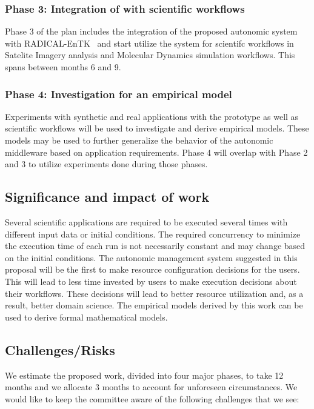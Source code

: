 \subsubsection{Phase 3: Integration of with scientific workflows}
Phase 3 of the plan includes the integration of the proposed autonomic system with RADICAL-EnTK~\cite{balasubramanian2018harnessing} and start utilize the system for scientifc workflows in Satelite Imagery analysis and Molecular Dynamics simulation workflows. This spans between months 6 and 9.

\subsubsection{Phase 4: Investigation for an empirical model}

Experiments with synthetic and real applications with the prototype as well as scientific workflows will be used to investigate and derive empirical models. These models may be used to further generalize the behavior of the autonomic middleware based on application requirements. Phase 4 will overlap with Phase 2 and 3 to utilize experiments done during those phases.

\subsection{Significance and impact of work}
Several scientific applications are required to be executed several times with different input data or initial conditions. The required concurrency to minimize the execution time of each run is not necessarily constant and may change based on the initial conditions. The autonomic management system suggested in this proposal will be the first to make resource configuration decisions for the users. This will lead to less time invested by users to make execution decisions about their workflows. These decisions will lead to better resource utilization and, as a result, better domain science. The empirical models derived by this work can be used to derive formal mathematical models.

\subsection{Challenges/Risks}

We estimate the proposed work, divided into four major phases, to take 12 months and we allocate 3 months to account for unforeseen circumstances. We would like to keep the committee aware of the following challenges that we see:

